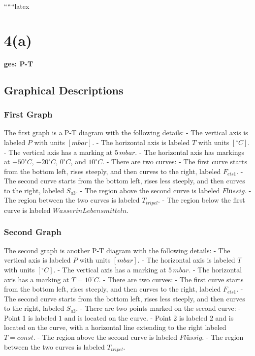 
``````latex


\section*{4(a)}
\textbf{ges: P-T}

\subsection*{Graphical Descriptions}

\subsubsection*{First Graph}
The first graph is a P-T diagram with the following details:
- The vertical axis is labeled \( P \) with units \([mbar]\).
- The horizontal axis is labeled \( T \) with units \([^\circ C]\).
- The vertical axis has a marking at \( 5 \, mbar \).
- The horizontal axis has markings at \( -50^\circ C \), \( -20^\circ C \), \( 0^\circ C \), and \( 10^\circ C \).
- There are two curves:
  - The first curve starts from the bottom left, rises steeply, and then curves to the right, labeled \( F_{eis1} \).
  - The second curve starts from the bottom left, rises less steeply, and then curves to the right, labeled \( S_{a3} \).
- The region above the second curve is labeled \( Flüssig \).
- The region between the two curves is labeled \( T_{tripel} \).
- The region below the first curve is labeled \( Wasser in Lebensmitteln \).

\subsubsection*{Second Graph}
The second graph is another P-T diagram with the following details:
- The vertical axis is labeled \( P \) with units \([mbar]\).
- The horizontal axis is labeled \( T \) with units \([^\circ C]\).
- The vertical axis has a marking at \( 5 \, mbar \).
- The horizontal axis has a marking at \( T = 10^\circ C \).
- There are two curves:
  - The first curve starts from the bottom left, rises steeply, and then curves to the right, labeled \( F_{eis1} \).
  - The second curve starts from the bottom left, rises less steeply, and then curves to the right, labeled \( S_{a3} \).
- There are two points marked on the second curve:
  - Point 1 is labeled \( 1 \) and is located on the curve.
  - Point 2 is labeled \( 2 \) and is located on the curve, with a horizontal line extending to the right labeled \( T = const \).
- The region above the second curve is labeled \( Flüssig \).
- The region between the two curves is labeled \( T_{tripel} \).

